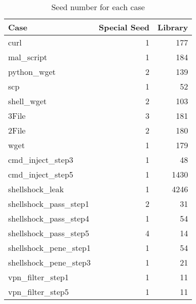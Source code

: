 \begin{table}[!htb]
\centering
\caption{Seed number for each case}
\begin{tabular}{|l|r|r|}
\hline
Case                    & \multicolumn{1}{l|}{Special Seed} & \multicolumn{1}{l|}{Library} \\ \hline
curl                    & 1                                 & 177                          \\ \hline
mal\_script             & 1                                 & 184                          \\ \hline
python\_wget            & 2                                 & 139                          \\ \hline
scp                     & 1                                 & 52                           \\ \hline
shell\_wget             & 2                                 & 103                          \\ \hline
3File                   & 3                                 & 181                          \\ \hline
2File                   & 2                                 & 180                          \\ \hline
wget                    & 1                                 & 179                          \\ \hline
cmd\_inject\_step3      & 1                                 & 48                           \\ \hline
cmd\_inject\_step5      & 1                                 & 1430                         \\ \hline
shellshock\_leak        & 1                                 & 4246                         \\ \hline
shellshock\_pass\_step1 & 2                                 & 31                           \\ \hline
shellshock\_pass\_step4 & 1                                 & 54                           \\ \hline
shellshock\_pass\_step5 & 4                                 & 14                           \\ \hline
shellshock\_pene\_step1 & 1                                 & 54                           \\ \hline
shellshock\_pene\_step3 & 1                                 & 21                           \\ \hline
vpn\_filter\_step1      & 1                                 & 11                           \\ \hline
vpn\_filter\_step5      & 1                                 & 11                           \\ \hline
\end{tabular}
\label{tab:seedNumber}
\end{table}